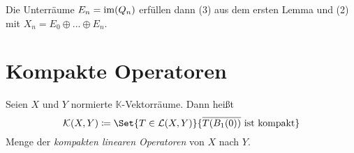 \documentclass{cheat-sheet}
\newcommand{\K}{\mathbb{K}}
\newcommand{\LSO}{\mathcal{L}} %
\newcommand{\scp}[2]{\left( #1 \!\mid\! #2 \right)} %
\begin{document}
\begin{samepage}
Die Unterräume $E_n = \mathop{\mathrm{im}}(Q_n)$ erfüllen dann (3) aus dem ersten Lemma und (2) mit $X_n = E_0 \oplus ... \oplus E_n$.
\fi

\iffalse
\begin{bsp}
  \begin{itemize}
    \item Ist $X$ Hilbertraum und $X = \overline{\bigcup_{n \in \N} X_n}$ mit $\mathrm{dim} X_n < \infty$, $X_n \subset X_{n+1}$, so sei $P_n$ die orthogonale Projektion auf $X_n$ und mit $X_{n+1} = X_n \perp E_n$ sei $Q_n$ die orthogonale Projektion auf $E_n$. Ist speziell $X_n = \mathrm{span} \Set{ e_i }{ 0 \leq i \leq n }$ mit einer ONB $(e_i)_{i \in \N}$, so ist
    \[ Q_n x = \scp{x}{e_n} e_n \quad \text{und} \quad P_n x = \sum_{i=0}^n \scp{x}{e_i} e_i \]
    \item Zerlege $\I$ in Punkte $M_n = \Set{ x_{n,i} }{ i = 0, ...., m_n }$ mit $0 = x_{n,0} < ... < x_{n,m} = 1$ und $h_n = \max_{i} \abs{x_{n_i,i} - x_{n_i,i-1}} \xrightarrow{n \to \infty} 0$ sowie $\fa{n \in \N} M_n \subset M_{n+1}$. Sei $A_{n_i,i} = (x_{n_i,i}, x_{n_i,i})$, $h_{n_i,i} = x_{n_i,i} - x_{n_i,i-1}$. Dann ist der Raum der stückweise konstanten Funktionen bzgl. dieser Zerlegung auf Level $n$:
    \[ X_n = \Set{ \sum_{i=1}^m \alpha_i \chi_{A_{n_i,i}} }{ \alpha_i \in \K }, \mathrm{dim}(X_n) = m_n \]
    Für $f \in L^1(\ointerval{0}{1})$ definiere $P_n f = \sum_{i=1}^{m_n} (\frac{1}{n_{n_i,i}} \Int{A_{n_i,i}}{}{f(s)}{s}) \chi_{A_{n_i,i}}$.
    Es ist $\mathrm{im}(P_1) = X_n$ und für die Standardzerlegung $x_{n_i,i} = i 2^{-n}$ ist $E_n = \mathrm{span} \Set{ e_{n_i} }{  1 \leq i \leq 2^{n-1} }$ mit $e_0 = \chi_{\ointerval{0}{1}}, e_{n,i} = \chi_{A_{n,2i-1}} - \chi_{A_{n,2i}}$.
  \end{itemize}
\end{bsp}
\fi


\section{Kompakte Operatoren}

\end{samepage}

\begin{defn}
  Seien $X$ und $Y$ normierte $\K$-Vektorräume. Dann heißt
  \[ \mathcal{K}(X, Y) \coloneqq \Set{ T \in \LSO(X, Y) }{ \overline{T(B_1(0))} \text{ ist kompakt} } \]
  Menge der \emph{kompakten linearen Operatoren} von $X$ nach $Y$.
\end{defn}
\end{document}
